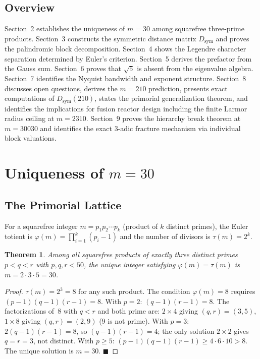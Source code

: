 \documentclass[11pt,letterpaper]{article}
\newtheorem{theorem}{Theorem}[section]
\theoremstyle{definition}
\begin{document}
\subsection{Overview}

Section~2 establishes the uniqueness of $m = 30$ among squarefree three-prime products. Section~3 constructs the symmetric distance matrix $D_{\text{sym}}$ and proves the palindromic block decomposition. Section~4 shows the Legendre character separation determined by Euler's criterion. Section~5 derives the prefactor from the Gauss sum. Section~6 proves that $\sqrt{5}$ is absent from the eigenvalue algebra. Section~7 identifies the Nyquist bandwidth and exponent structure. Section~8 discusses open questions, derives the $m = 210$ prediction, presents exact computations of $D_{\text{sym}}(210)$, states the primorial generalization theorem, and identifies the implications for fusion reactor design including the finite Larmor radius ceiling at $m = 2310$. Section~9 proves the hierarchy break theorem at $m = 30030$ and identifies the exact 3-adic fracture mechanism via individual block valuations.


\section{Uniqueness of $m = 30$}

\subsection{The Primorial Lattice}

For a squarefree integer $m = p_1 p_2 \cdots p_k$ (product of $k$ distinct primes), the Euler totient is $\varphi(m) = \prod_{i=1}^k (p_i - 1)$ and the number of divisors is $\tau(m) = 2^k$.

\begin{theorem}
Among all squarefree products of exactly three distinct primes $p < q < r$ with $p, q, r < 50$, the unique integer satisfying $\varphi(m) = \tau(m)$ is $m = 2 \cdot 3 \cdot 5 = 30$.
\end{theorem}

\begin{proof}
$\tau(m) = 2^3 = 8$ for any such product. The condition $\varphi(m) = 8$ requires $(p-1)(q-1)(r-1) = 8$. With $p = 2$: $(q-1)(r-1) = 8$. The factorizations of~8 with $q < r$ and both prime are: $2 \times 4$ giving $(q,r) = (3,5)$, $1 \times 8$ giving $(q,r) = (2,9)$ (9 is not prime). With $p = 3$: $2(q-1)(r-1) = 8$, so $(q-1)(r-1) = 4$; the only solution $2 \times 2$ gives $q = r = 3$, not distinct. With $p \geq 5$: $(p-1)(q-1)(r-1) \geq 4 \cdot 6 \cdot 10 > 8$. The unique solution is $m = 30$. $\blacksquare$
\end{proof}
\end{document}
